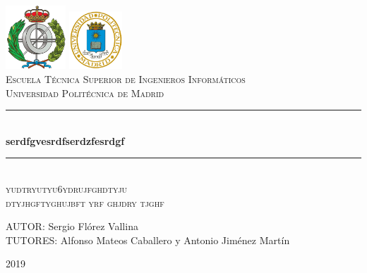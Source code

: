 \documentclass[spanish,12pt, a4paper,twoside]{paper}
\begin{document}
    \begin{titlepage}

        \newcommand{\HRule}{\rule{\linewidth}{0.5mm}} %

        \center %

        \includegraphics[width=2.25cm]{recursos/logoFi.png}
        \hspace{8cm}
        \includegraphics[width=2cm]{recursos/logoupm.png}
        \\[1cm]

        \textsc{\Large Escuela Técnica Superior de Ingenieros Informáticos}\\[0.5cm]
        \textsc{\large Universidad Politécnica de Madrid}
        \\[3cm]


        \HRule \\[0.4cm]
        { \huge \bfseries serdfgvesrdfserdzfesrdgf}\\[0.4cm] %
        \HRule \\[2.5cm]

        \textsc{\LARGE yudtryutyu6ydrujfghdtyju}\\[0.5cm]
        \textsc{\Large dtyjhgftyghujbft yrf ghjdry tjghf }\\[2.5cm]

        \begin{flushright}
            \large
            AUTOR: Sergio Flórez Vallina\\
            TUTORES: Alfonso Mateos Caballero y \linebreak
            Antonio Jiménez Martín
        \end{flushright}

        \vspace{1.3cm}

        { {2019}}\\[3cm]

        \vfill

    \end{titlepage}
\end{document}
